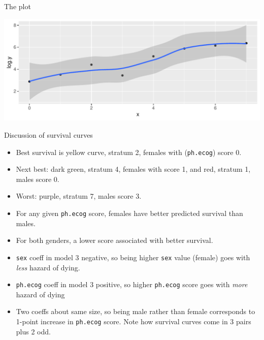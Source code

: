 \begin{frame}[fragile]{The plot}

 
\begin{knitrout}
\color{fgcolor}\begin{kframe}
\begin{alltt}
\end{alltt}
\end{kframe}
\includegraphics[width=\maxwidth]{figure/unnamed-chunk-22-1} 

\end{knitrout}
  
  
\end{frame}


\begin{frame}[fragile]{Discussion of survival curves}

  \begin{itemize}
  \item Best survival is yellow curve, stratum 2, females with
    (\texttt{ph.ecog}) score 0.
    \item Next best: dark green, stratum 4, females with score 1, and
      red, stratum 1, males score 0.
    \item Worst: purple, stratum 7, males score 3.
      \item For any given \texttt{ph.ecog} score, females have better
        predicted survival than males.
      \item For both genders, a lower score associated with better
        survival.
  \item \texttt{sex} coeff in model 3 negative, so being higher
    \texttt{sex} value (female) goes with \emph{less} hazard of dying.
  \item \texttt{ph.ecog} coeff in model 3 positive, so higher
    \texttt{ph.ecog} score goes with \emph{more} hazard of dying
  \item Two coeffs about same size, so being male rather than female
    corresponds to 1-point increase in \texttt{ph.ecog} score. Note
    how survival curves come in 3 pairs plus 2 odd.
  \end{itemize}

\end{frame}


